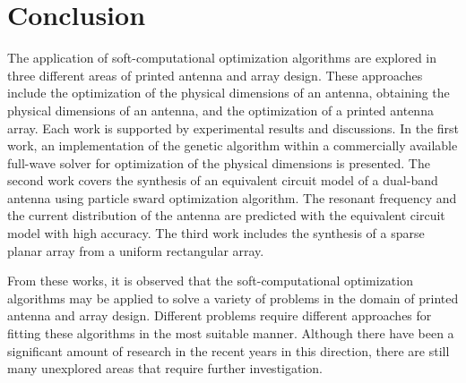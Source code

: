 \section{Conclusion}\label{c6sec_cncl}
The application of soft-computational optimization algorithms are explored in three different areas of printed antenna and array design. These approaches include the optimization of the physical dimensions of an antenna, obtaining the physical dimensions of an antenna, and the optimization of a printed antenna array. Each work is supported by experimental results and discussions. In the first work, an implementation of the genetic algorithm within a commercially available full-wave solver for optimization of the physical dimensions is presented. The second work covers the synthesis of an equivalent circuit model of a dual-band antenna using particle sward optimization algorithm. The resonant frequency and the current distribution of the antenna are predicted with the equivalent circuit model with high accuracy. The third work includes the synthesis of a sparse planar array from a uniform rectangular array.

From these works, it is observed that the soft-computational optimization algorithms may be applied to solve a variety of problems in the domain of printed antenna and array design. Different problems require different approaches for fitting these algorithms in the most suitable manner. Although there have been a significant amount of research in the recent years in this direction, there are still many unexplored areas that require further investigation.

